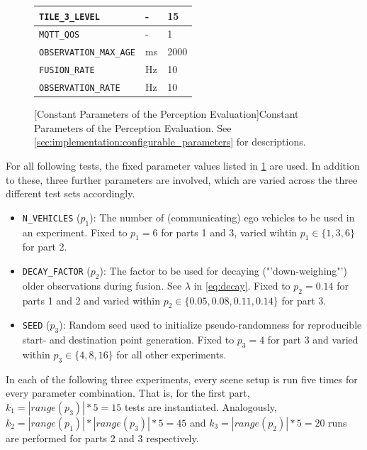 \begin{figure}
\begin{minipage}{0.5\textwidth}
\begin{tabular}{|p{4.1cm}|p{1.1cm}|p{1.4cm}|}
			\texttt{TILE\_3\_LEVEL} & - & 15 \\ 
			\hline 
			\texttt{MQTT\_QOS} & - & 1 \\ 
			\hline 
			\texttt{OBSERVATION\_MAX\_AGE} & ms & 2000 \\ 
			\hline 
			\texttt{FUSION\_RATE} & Hz & 10 \\ 
			\hline 
			\texttt{OBSERVATION\_RATE} & Hz & 10 \\ 
			\hline
		\end{tabular} 
	\end{minipage}
	[Constant Parameters of the Perception Evaluation]{Constant Parameters of the Perception Evaluation. See \cref{sec:implementation:configurable_parameters} for descriptions.}
	\label{tab:perception_evaluation:constant_parameters}
\end{figure}

For all following tests, the fixed parameter values listed in \cref{tab:perception_evaluation:constant_parameters} are used. In addition to these, three further parameters are involved, which are varied across the three different test sets accordingly. 

\begin{itemize}
	\item \texttt{N\_VEHICLES} ($p_1$): The number of (communicating) ego vehicles to be used in an experiment. Fixed to $p_1 = 6$ for parts 1 and 3, varied wihtin $p_1 \in \{1, 3, 6\}$ for part 2.
	\item \texttt{DECAY\_FACTOR} ($p_2$): The factor to be used for decaying ("'down-weighing"') older observations during fusion. See $\lambda$ in \cref{eq:decay}. Fixed to $p_2 = 0.14$ for parts 1 and 2 and varied within $p_2 \in \{0.05, 0.08, 0.11, 0.14\}$ for part 3.
	\item \texttt{SEED} ($p_3$): Random seed used to initialize pseudo-randomness for reproducible start- and destination point generation. Fixed to $p_3 = 4$ for part 3 and varied within $p_3 \in \{4, 8, 16\}$ for all other experiments.
\end{itemize}

In each of the following three experiments, every scene setup is run five times for every parameter combination. That is, for the first part, $k_1 = |\textit{range}(p_3)| * 5 = 15$ tests are instantiated. Analogously, $k_2 = |\textit{range}(p_1)| * |\textit{range}(p_3)| * 5 = 45$ and $k_3 = |\textit{range}(p_2)| * 5 = 20$ runs are performed for parts 2 and 3 respectively.
\par
\bigskip

